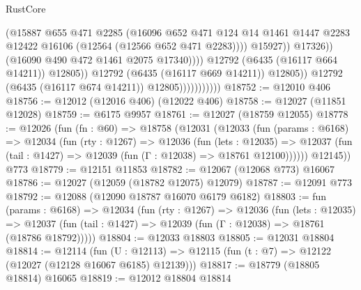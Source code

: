 \begin{lexlean}{RustCore}
\begin{coremodule}
                                                (@15887
                                                  @655
                                                  @471
                                                  @2285
                                                  (@16096
                                                    @652
                                                    @471
                                                    @124
                                                    @14
                                                    @1461
                                                    @1447
                                                    @2283
                                                    @12422
                                                    @16106
                                                    (@12564 (@12566 @652 @471 @2283))))
                                                @15927))
                                            @17326))
                                        (@16090 @490 @472 @1461 @2075 @17340))))
                                  @12792
                                  (@6435 (@16117 @664 @14211))
                                  @12805))
                              @12792
                              (@6435 (@16117 @669 @14211))
                              @12805))
                          @12792
                          (@6435 (@16117 @674 @14211))
                          @12805)))))))))))
@18752 := @12010 @406
@18756 := @12012 (@12016 @406) (@12022 @406)
@18758 := @12027 (@11851 @12028)
@18759 := @6175 @9957
@18761 := @12027 (@18759 @12055)
@18778 := @12026
    (fun (fn : @60) =>
    @18758
      (@12031
        (@12033
          (fun (params : @6168) =>
          @12034
            (fun (rty : @1267) =>
            @12036
              (fun (lets : @12035) =>
              @12037 (fun (tail : @1427) => @12039 (fun (Γ : @12038) => @18761 @12100))))))
        @12145))
    @773
@18779 := @12151 @11853
@18782 := @12067 (@12068 @773) @16067
@18786 := @12027 (@12059 (@18782 @12075) @12079)
@18787 := @12091 @773
@18792 := @12088 (@12090 @18787 @16070 @6179 @6182)
@18803 := fun (params : @6168) =>
  @12034
    (fun (rty : @1267) =>
    @12036
      (fun (lets : @12035) =>
      @12037 (fun (tail : @1427) => @12039 (fun (Γ : @12038) => @18761 (@18786 @18792)))))
@18804 := @12033 @18803
@18805 := @12031 @18804
@18814 := @12114
    (fun (U : @12113) => @12115 (fun (t : @7) => @12122 (@12027 (@12128 @16067 @6185) @12139)))
@18817 := @18779 (@18805 @18814) @16065
@18819 := @12012 @18804 @18814

\end{coremodule}
\end{lexlean}
